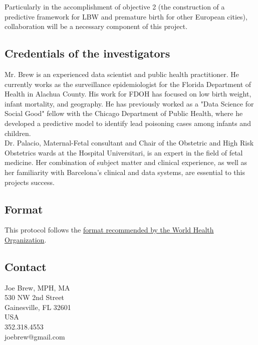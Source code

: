 \documentclass{article}
\begin{document}
\begin{multicols}{2}
Particularly in the accomplishment of objective 2 (the construction of a predictive framework for LBW and premature birth for other European cities), collaboration will be a necessary component of this project.  

\subsection*{Credentials of the investigators}

Mr. Brew is an experienced data scientist and public health practitioner.  He currently works as the surveillance epidemiologist for the Florida Department of Health in Alachua County.  His work for FDOH has focused on low birth weight, infant mortality, and geography.  He has previously worked as a "Data Science for Social Good" fellow with the Chicago Department of Public Health, where he developed a predictive model to identify lead poisoning cases among infants and children. \\

Dr. Palacio, Maternal-Fetal consultant and Chair of the Obstetric and High Risk Obstetrics wards at the Hospital Universitari, is an expert in the field of fetal medicine.  Her combination of subject matter and clinical experience, as well as her familiarity with Barcelona's clinical and data systems, are essential to this projects success.  


\subsection*{Format}
This protocol follows the \href{http://www.who.int/rpc/research_ethics/format_rp/en/}{format recommended by the World Health Organization}. \\

\subsection*{Contact}
Joe Brew, MPH, MA\\
530 NW 2nd Street \\
Gainesville, FL 32601 \\
USA \\
352.318.4553 \\
joebrew@gmail.com

\end{multicols}
\newpage


\end{document}
